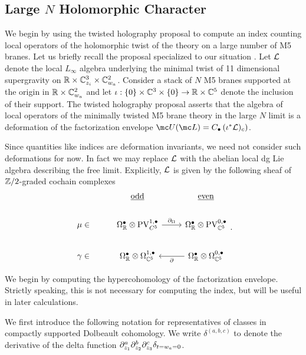 \subsection{Large $N$ Holomorphic Character}

We begin by using the twisted holography proposal to compute an index counting local operators of the holomorphic twist of the theory on a large number of M5 branes. Let us briefly recall the proposal specialized to our situation . Let $\mathcal L$ denote the local $L_{\infty}$ algebra underlying the minimal twist of 11 dimensional supergravity on $\mathbb{R}\times \mathbb{C}^{3}_{z_{i}}\times \mathbb{C}^{2}_{w_{a}}$. Consider a stack of $N$ M5 branes supported at the origin in $\mathbb{R}\times \mathbb{C}^{2}_{w_{a}}$ and let $\iota : \{0\}\times \mathbb{C}^{3} \times \{0\}\to \mathbb{R}\times \mathbb{C}^{5}$ denote the inclusion of their support. The twisted holography proposal asserts that the algebra of local operators of the minimally twisted M5 brane theory in the large $N$ limit is a deformation of the factorization envelope $\mc U(\mc L) = C_{\bullet}\left (\iota^{*}\cL)_{c} \right )$.

Since quantities like indices are deformation invariants, we need not consider such deformations for now. In fact we may replace $\mathcal L$ with the abelian local dg Lie algebra describing the free limit. Explicitly, $\mathcal L$ is given by the following sheaf of $\mathbb{Z}/2$-graded cochain complexes

\[
\begin{tikzcd}
  &  \ul{\rm odd} & \ul{\rm even} \\
 \mu \in & \Omega^{\bullet}_{\R}\otimes\PV^{1,\bullet}_{C^{5}} \ar[r, "\del_{\Omega}"] & \Omega^{\bullet}_{\R}\otimes\PV^{0,\bullet}_{\C^{5}}\\
 \gamma \in & \Omega^{\bullet}_{\R}\otimes\Omega^{1,\bullet}_{\C^{5}}& \Omega^{\bullet}_{\R}\otimes\Omega^{0,\bullet}_{\C^{5}} \ar[l, "\del"]
\end{tikzcd}
.\]


\parsec
We begin by computing the hypercohomology of the factorization envelope. Strictly speaking, this is not necessary for computing the index, but will be useful in later calculations.

We first introduce the following notation for representatives of classes in compactly supported Dolbeault cohomology. We write $\delta^{(a,b,c)}$ to denote the derivative of the delta function $\partial_{z_{1}}^{a}\partial_{z_{2}}^{b}\partial_{z_{3}}^{c}\delta_{t=w_{a}=0}$.

